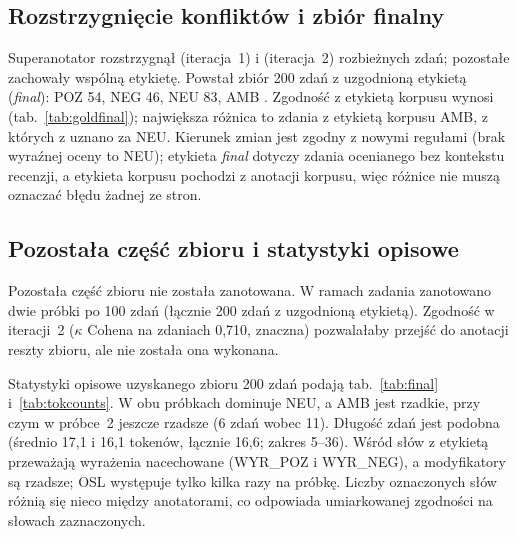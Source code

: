 \documentclass[11pt,a4paper]{article}
\begin{document}
\begin{table}[H]
\centering\small

\caption{Kappa Cohena dla każdej klasy zdań osobno (klasa kontra reszta); A1/A2 to liczby zdań danej klasy.}
\label{tab:perclass}
\end{table}

\subsection{Rozstrzygnięcie konfliktów i zbiór finalny}

Superanotator rozstrzygnął \nConfI{} (iteracja~1) i \nConfII{} (iteracja~2) rozbieżnych zdań; pozostałe zachowały
wspólną etykietę. Powstał zbiór 200 zdań z uzgodnioną etykietą (\emph{final}): POZ 54, NEG 46, NEU 83, AMB
\finalAmbN{}. Zgodność z etykietą korpusu wynosi \goldFinalPct{} (tab.~\ref{tab:goldfinal}); największa różnica to
zdania z etykietą korpusu AMB, z których \goldAmbToNeu{} z \goldAmbN{} uznano za NEU. Kierunek zmian jest zgodny z
nowymi regułami (brak wyraźnej oceny to NEU); etykieta \emph{final} dotyczy zdania ocenianego bez kontekstu recenzji,
a etykieta korpusu pochodzi z anotacji korpusu, więc różnice nie muszą oznaczać błędu żadnej ze stron.

\begin{table}[H]
\centering\small

\caption{Etykieta korpusu (gold) a etykieta uzgodniona (final), 200 zdań.}
\label{tab:goldfinal}
\end{table}

\subsection{Pozostała część zbioru i statystyki opisowe}

Pozostała część zbioru nie została zanotowana. W ramach zadania zanotowano dwie próbki po 100 zdań (łącznie 200 zdań
z uzgodnioną etykietą). Zgodność w iteracji~2 ($\kappa$ Cohena na zdaniach 0,710, znaczna) pozwalałaby przejść do
anotacji reszty zbioru, ale nie została ona wykonana.

Statystyki opisowe uzyskanego zbioru 200 zdań podają tab.~\ref{tab:final} i~\ref{tab:tokcounts}. W obu próbkach
dominuje NEU, a AMB jest rzadkie, przy czym w próbce~2 jeszcze rzadsze (6 zdań wobec 11). Długość zdań jest podobna
(średnio 17,1 i 16,1 tokenów, łącznie 16,6; zakres 5--36). Wśród słów z etykietą przeważają wyrażenia nacechowane
(WYR\_POZ i WYR\_NEG), a modyfikatory są rzadsze; OSL występuje tylko kilka razy na próbkę. Liczby oznaczonych słów
różnią się nieco między anotatorami, co odpowiada umiarkowanej zgodności na słowach zaznaczonych.
\end{document}
